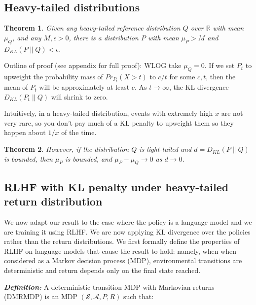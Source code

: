\documentclass{article}
\newtheorem{theorem}{Theorem}
\begin{document}
\subsection{Heavy-tailed distributions}
\begin{theorem}
\label{thm1}
Given any heavy-tailed reference distribution
\(Q\) over \(\mathbb R\) with mean \(\mu_Q\), and any
\(M, \epsilon > 0\), there is a distribution \(P\) with mean \(\mu_P>M\)
and \(D_{KL}(P \| Q) < \epsilon\).
\end{theorem}

Outline of proof (see appendix for full proof): WLOG take $\mu_Q = 0$. If we set $P_t$ to upweight the probability mass of $Pr_{P_t}(X > t)$ to $c/t$ for some $c, t$, then the mean of $P_t$ will be approximately at least $c$. As $t \to \infty$, the KL divergence $D_{KL}(P_t \| Q)$ will shrink to zero.

Intuitively, in a heavy-tailed distribution, events with extremely high $x$ are not very rare, so you don't pay much of a KL penalty to upweight them so they happen about $1/x$ of the time. 

\begin{theorem}
    \label{thm2} However, if the distribution $Q$ is light-tailed and \(d = D_{KL}(P \| Q)\) is bounded, then
    \(\mathbb \mu_P \) is bounded, and \(\mu_P - \mu_Q \to 0\) as
    \(d \to 0\).
    \end{theorem}

\hypertarget{theorem-about-RLHF-with-KL-penalty}{%
\subsection{RLHF with KL penalty under heavy-tailed return distribution}}

We now adapt our result to the case where the policy is a language model and we are training it using RLHF. We are now applying KL divergence over the policies rather than the return distributions. We first formally define the properties of RLHF on language models that cause the result to hold: namely, when when considered as a Markov decision process (MDP), environmental transitions are deterministic and return depends only on the final state reached.

\textbf{\emph{Definition:}} A deterministic-transition MDP with
Markovian returns (DMRMDP) is an MDP \((\mathcal S, \mathcal A, P, R)\)
such that:
\end{document}
